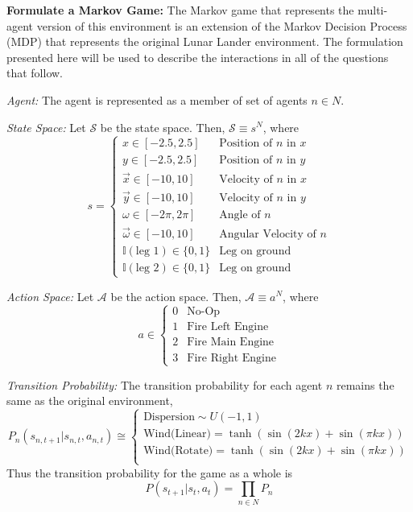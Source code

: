 \documentclass[12pt,letterpaper]{exam}
\begin{document}
\begin{questions}
\setcounter{question}{1}
	\question \textbf{Formulate a Markov Game:}
	The Markov game that represents the multi-agent version of this
	environment is an extension of the Markov Decision Process (MDP)
	that represents the original Lunar Lander environment.
	The formulation presented here will be used to describe the 
	interactions in all of the questions that follow.

	\emph{Agent:} The agent is represented as a member of set of agents 
	\(n\in N\).

	\emph{State Space:} Let \(\mathcal{S}\) be the state space. 
	Then, \(\mathcal{S} \equiv s^N\), where 
	\[s = \begin{cases}
		x \in [-2.5,2.5]   & \text{Position of } n \text{ in } x \\
		y \in [-2.5,2.5]   & \text{Position of } n \text{ in } y \\
		\vec{x} \in [-10,10] & \text{Velocity of } n \text{ in } x \\
		\vec{y} \in [-10,10] & \text{Velocity of } n \text{ in } y \\
		\omega \in [-2\pi,2\pi] & \text{Angle of } n\\
		\vec{\omega} \in [-10,10] & \text{Angular Velocity of } n\\
		\mathbb{I}(\text{leg 1}) \in\{0,1\}  & \text{Leg on ground}\\
		\mathbb{I}(\text{leg 2}) \in\{0,1\}  & \text{Leg on ground}
	\end{cases}\]

	\emph{Action Space:} Let \(\mathcal{A}\) be the action space.
	Then, \(\mathcal{A} \equiv a^N\), where 
	\[a \in \begin{cases}
		0 & \text{No-Op} \\
		1 & \text{Fire Left Engine} \\
		2 & \text{Fire Main Engine} \\
		3 & \text{Fire Right Engine}
	\end{cases}\]

	\emph{Transition Probability:} The transition probability for
	each agent \(n\) remains the same as the original environment,
	\[P_n(s_{n,t+1}|s_{n,t},a_{n,t}) \cong \begin{cases}
		\text{Dispersion} \sim U(-1,1) \\
		\text{Wind(Linear)} = \tanh(\sin(2 k x) + \sin(\pi k x)) \\
		\text{Wind(Rotate)} = \tanh(\sin(2 k x) + \sin(\pi k x)) \\
	\end{cases}\]
	Thus the transition probability for the game as a whole is
	\[P(s_{t+1}|s_{t},a_{t}) = \prod_{n\in N} P_n\]


\end{questions}
\end{document}
